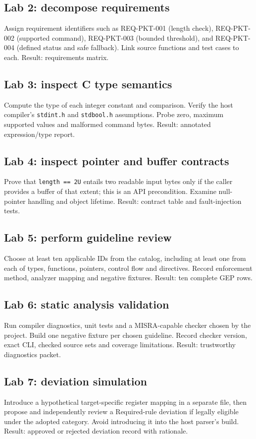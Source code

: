 \documentclass[10pt,letterpaper]{article}
\begin{document}
\subsection{Lab 2: decompose requirements}
Assign requirement identifiers such as REQ-PKT-001 (length check), REQ-PKT-002 (supported command), REQ-PKT-003 (bounded threshold), and REQ-PKT-004 (defined status and safe fallback). Link source functions and test cases to each. Result: requirements matrix.
\subsection{Lab 3: inspect C type semantics}
Compute the type of each integer constant and comparison. Verify the host compiler's \texttt{stdint.h} and \texttt{stdbool.h} assumptions. Probe zero, maximum supported values and malformed command bytes. Result: annotated expression/type report.
\subsection{Lab 4: inspect pointer and buffer contracts}
Prove that \texttt{length == 2U} entails two readable input bytes only if the caller provides a buffer of that extent; this is an API precondition. Examine null-pointer handling and object lifetime. Result: contract table and fault-injection tests.
\subsection{Lab 5: perform guideline review}
Choose at least ten applicable IDs from the catalog, including at least one from each of types, functions, pointers, control flow and directives. Record enforcement method, analyzer mapping and negative fixtures. Result: ten complete GEP rows.
\subsection{Lab 6: static analysis validation}
Run compiler diagnostics, unit tests and a MISRA-capable checker chosen by the project. Build one negative fixture per chosen guideline. Record checker version, exact CLI, checked source sets and coverage limitations. Result: trustworthy diagnostics packet.
\subsection{Lab 7: deviation simulation}
Introduce a hypothetical target-specific register mapping in a separate file, then propose and independently review a Required-rule deviation if legally eligible under the adopted category. Avoid introducing it into the host parser's build. Result: approved or rejected deviation record with rationale.
\end{document}
